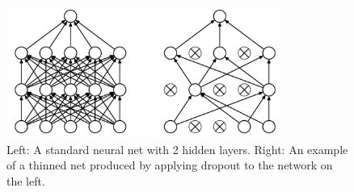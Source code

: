 \begin{figure}[H]	\includegraphics[width=0.8\textwidth]{images/dropout.png} 
    \centering

\caption{Left: A standard neural net with 2 hidden layers. Right: An example of a thinned net produced by applying dropout to the network on the left. \cite{Srivastava2014Dropout:Overfitting} } 

\label{fig:dropout}
\end{figure}